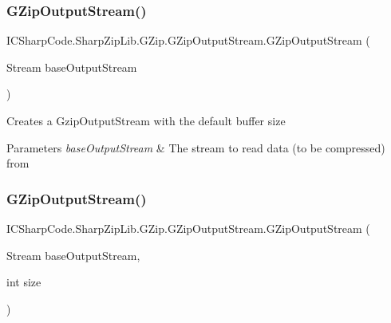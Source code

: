 \subsubsection{\texorpdfstring{G\+Zip\+Output\+Stream()}{GZipOutputStream()}\hspace{0.1cm}{\footnotesize\ttfamily [1/2]}}
{\footnotesize\ttfamily I\+C\+Sharp\+Code.\+Sharp\+Zip\+Lib.\+G\+Zip.\+G\+Zip\+Output\+Stream.\+G\+Zip\+Output\+Stream (\begin{DoxyParamCaption}\item[{Stream}]{base\+Output\+Stream }\end{DoxyParamCaption})\hspace{0.3cm}{\ttfamily [inline]}}



Creates a Gzip\+Output\+Stream with the default buffer size 


\begin{DoxyParams}{Parameters}
{\em base\+Output\+Stream} & The stream to read data (to be compressed) from \\
\hline
\end{DoxyParams}
\mbox{\label{class_i_c_sharp_code_1_1_sharp_zip_lib_1_1_g_zip_1_1_g_zip_output_stream_ab3537d9d8872a588a9cf62ae4530a5a6}} 
\subsubsection{\texorpdfstring{G\+Zip\+Output\+Stream()}{GZipOutputStream()}\hspace{0.1cm}{\footnotesize\ttfamily [2/2]}}
{\footnotesize\ttfamily I\+C\+Sharp\+Code.\+Sharp\+Zip\+Lib.\+G\+Zip.\+G\+Zip\+Output\+Stream.\+G\+Zip\+Output\+Stream (\begin{DoxyParamCaption}\item[{Stream}]{base\+Output\+Stream,  }\item[{int}]{size }\end{DoxyParamCaption})\hspace{0.3cm}{\ttfamily [inline]}}



